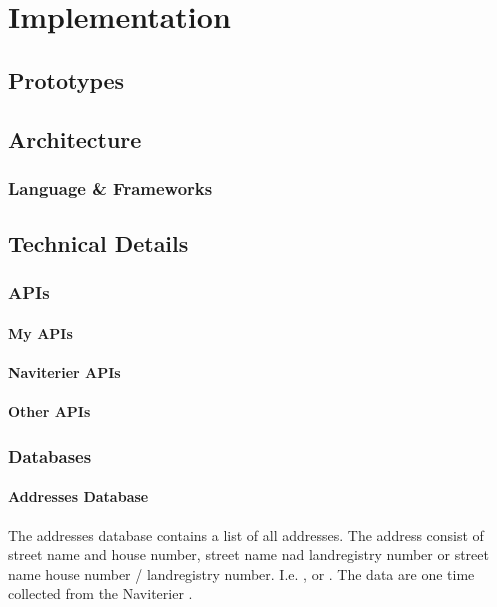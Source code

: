 
	\chapter{Implementation}
	\section{Prototypes}
	\subsection{\reversegeo}
	\subsection{\gps}
	\subsection{\poi}
	\section{Architecture}
	\subsection{Language \& Frameworks}
	\section{Technical Details}
	\subsection{APIs}
	\subsubsection{My APIs}
	\subsubsection{Naviterier APIs}
	\subsubsection{Other APIs}
	\subsection{Databases}
	\subsubsection{Addresses Database}
	The addresses database contains a list of all addresses. The address consist of street name and house number, street name nad landregistry number or street name house number / landregistry number. I.e. ,  or .
	The data are one time collected from the Naviterier  \cite{naviterier-addresses}.
	

